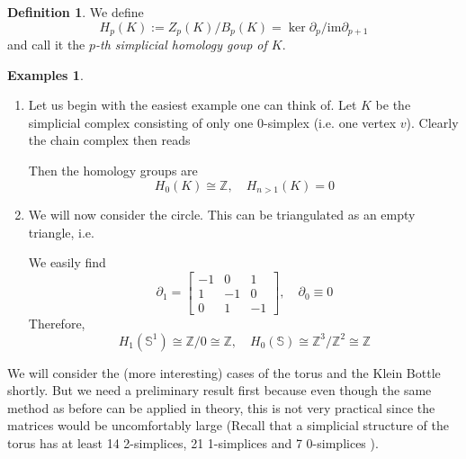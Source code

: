 \documentclass[toc=bib, headinclude]{scrartcl}
\theoremstyle{plain}
\theoremstyle{definition}
\newtheorem	{definition}[theorem]{Definition}
\newtheorem{examples}[theorem]{Examples}
\theoremstyle{remark}
\newcommand{\isom}{\cong}
\newcommand{\Z}{\mathbb{Z}}
\newcommand{\Sp}{\mathbb{S}}
\begin{document}
\begin{definition}
	We define \[
	H_p(K):=Z_p(K)/B_p(K)=\ker \partial_p/\mathrm{im} \partial_{p+1}
	\]
	and call it the \textit{${p}$-th simplicial homology goup of ${K}$}.
\end{definition}
\clearpage
\begin{examples}\mbox{}
	\begin{enumerate}

\item Let us begin with the easiest example one can think of. Let $K$ be the simplicial complex consisting of only one 0-simplex (i.e. one vertex $v$). Clearly the chain complex then reads

\begin{center}
\end{center}
Then the homology groups are \[
H_0(K)\isom\Z,\quad H_{n>1}(K)=0
\]


\item We will now consider the circle. This can be triangulated as an empty triangle, i.e.
\begin{center}
	
\end{center}

We easily find 
\[
\partial_1=\begin{bmatrix}
-1&0&1\\1&-1&0\\0&1&-1
\end{bmatrix},\quad \partial_0\equiv 0
\]
Therefore,
\[H_1(\Sp^1)\isom\Z/0\isom\Z,\quad H_0(\Sp)\isom\Z^3/\Z^2\isom\Z
\]

	\end{enumerate}

We will consider the (more interesting) cases of the torus and the Klein Bottle shortly. But we need a preliminary result first because even though the same method as before can be applied in theory, this is not very practical since the matrices would be uncomfortably large (Recall that a simplicial structure of the torus has at least 14 2-simplices, 21 1-simplices and 7 0-simplices \parencite[p. 107]{ha}).


\end{examples}
\end{document}
